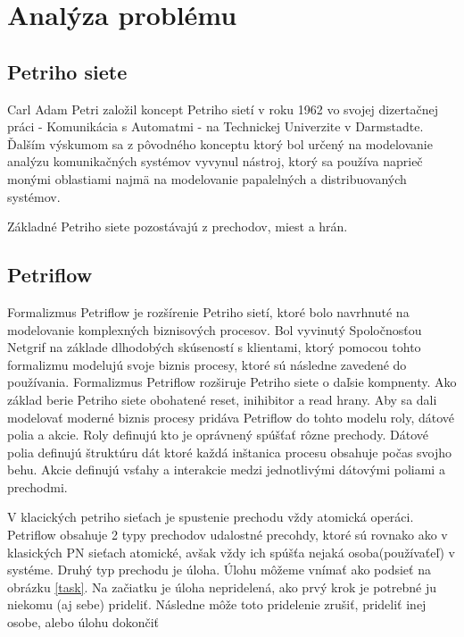  

  

\section{Analýza problému} 

  

\subsection{Petriho siete} %

 Carl Adam Petri založil koncept Petriho sietí v roku 1962 vo svojej dizertačnej práci - Komunikácia s Automatmi - na Technickej Univerzite v Darmstadte. Ďalším výskumom sa z pôvodného konceptu ktorý bol určený na modelovanie analýzu komunikačných systémov vyvynul nástroj, ktorý sa používa naprieč monými oblastiami najmä na modelovanie papalelných a distribuovaných systémov. 
 
 Základné Petriho siete pozostávajú z prechodov, miest a hrán. 
  
\subsection{Petriflow} %
\cite{petriflow_clanok}
Formalizmus Petriflow je rozšírenie Petriho sietí, ktoré bolo navrhnuté na modelovanie komplexných biznisových procesov. Bol vyvinutý Spoločnosťou Netgrif na základe dlhodobých skúseností s klientami, ktorý pomocou tohto formalizmu modelujú svoje biznis procesy, ktoré sú následne zavedené do používania. 
Formalizmus Petriflow rozširuje Petriho siete o daľsie kompnenty. Ako základ berie Petriho siete obohatené reset, inihibitor a read hrany. Aby sa dali modelovať moderné biznis procesy pridáva Petriflow do tohto modelu roly, dátové polia a akcie. 
Roly definujú kto je oprávnený spúšťať rôzne prechody. 
Dátové polia definujú štruktúru dát ktoré každá inštanica procesu obsahuje počas svojho behu.
Akcie definujú vsťahy a interakcie medzi jednotlivými dátovými poliami a prechodmi.

V klacických petriho sieťach je spustenie prechodu vždy atomická operáci. Petriflow obsahuje 2 typy prechodov udalostné precohdy, ktoré sú rovnako ako v klasických PN sieťach atomické, avšak vždy ich spúšťa nejaká osoba(používaťeľ) v systéme. Druhý typ prechodu je úloha. Úlohu môžeme vnímať ako podsieť na obrázku \ref{task}. Na začiatku je úloha nepridelená, ako prvý krok je potrebné ju niekomu (aj sebe) prideliť. Následne môže toto pridelenie zrušiť, prideliť inej osobe, alebo úlohu dokončiť


